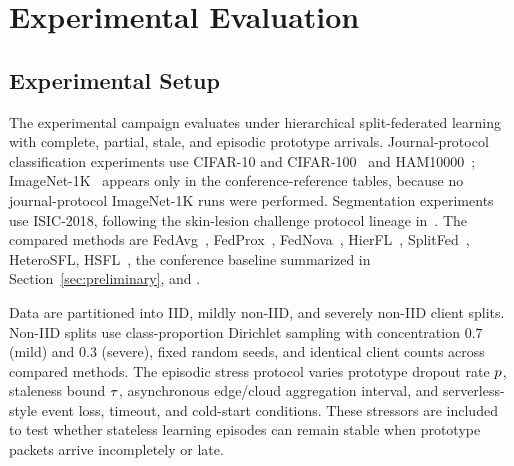 \makeatletter\providecommand{\tabrows}[1]{\@@input #1 }\makeatother
{}
\section{Experimental Evaluation}
\label{sec:experiments}

\subsection{Experimental Setup}
The experimental campaign evaluates \ehsfp under hierarchical split-federated learning with complete, partial, stale, and episodic prototype arrivals. Journal-protocol classification experiments use CIFAR-10 and CIFAR-100~\cite{krizhevsky2009learning} and HAM10000~\cite{tschandl2018ham10000}; ImageNet-1K~\cite{5206848} appears only in the conference-reference tables, because no journal-protocol ImageNet-1K runs were performed. Segmentation experiments use ISIC-2018, following the skin-lesion challenge protocol lineage in~\cite{8363547}. The compared methods are FedAvg~\cite{mcmahan2017communication}, FedProx~\cite{li2020federated}, FedNova~\cite{10.5555/3495724.3496362}, HierFL~\cite{liu2020client,9488756}, SplitFed~\cite{thapa2022splitfed}, HeteroSFL, HSFL~\cite{quan2023hiersfl}, the conference \hsfp baseline summarized in Section~\ref{sec:preliminary}, and \ehsfp.

Data are partitioned into IID, mildly non-IID, and severely non-IID client splits. Non-IID splits use class-proportion Dirichlet sampling with concentration $0.7$ (mild) and $0.3$ (severe), fixed random seeds, and identical client counts across compared methods.
The episodic stress protocol varies prototype dropout rate $p$, staleness bound $\tau$, asynchronous edge/cloud aggregation interval, and serverless-style event loss, timeout, and cold-start conditions. These stressors are included to test whether stateless learning episodes can remain stable when prototype packets arrive incompletely or late.

